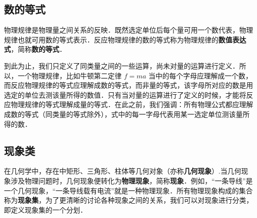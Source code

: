 
\subsection{数的等式}
物理规律是物理量之间关系的反映．既然选定单位后每个量可用一个数代表，物理规律也就可用数的等式表示．反应物理规律的数的等式称为物理规律的\textbf{数值表达式}，简称\textbf{数的等式}．

到此为止，我们只定义了同类量之间的一些运算，尚未对量的运算进行定义．所以，一个物理规律，比如牛顿第二定律 $f=ma$ 当中的每个字母应理解成一个数，而反应物理规律的等式应理解成数的等式，而非量的等式，该字母所对应的数是用选定的单位去测该量所得的数值．只有当对量的运算进行了定义的时候，才能将反应物理规律的等式理解成量的等式．在此之前，我们强调：所有物理公式都应理解成数的等式（同类量的等式除外），式中的每一字母代表用某一选定单位测该量所得的数．
\subsection{现象类}
在几何学中，存在中矩形、三角形、柱体等几何对象（亦称\textbf{几何现象}）.当几何现象涉及物理问题时，几何现象便转化为\textbf{物理现象}，简称\textbf{现象}．例如，“一条导线”是一个几何现象，“一条导线载有电流”就是一种物理现象．所有物理现象构成的集合称为\textbf{现象集}，为了更清晰的讨论各种现象之间的关系，我们可以对现象进行分类，即定义现象集的一个分划．

